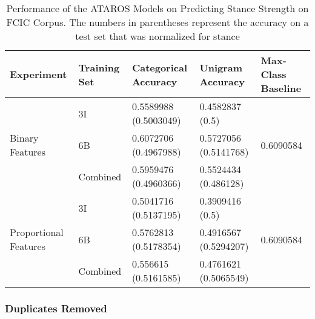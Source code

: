 \begin{table}[h]
\centering
\begin{tabular}{l | l | l | l | l  } 
	\textbf{Experiment}  & \textbf{Training Set} & \textbf{Categorical Accuracy} &  \textbf{Unigram Accuracy} & \textbf{Max-Class Baseline} \\ 
	\hline 
	\multirow{3}{*}{Binary Features}
		& 3I & \num{0.5589988} (\num{0.5003049}) & \num{0.4582837} (\num{0.5}) & \multirow{3}{*}{\num{0.6090584}} \\ 
	    & 6B & \num{0.6072706} (\num{0.4967988}) & \num{0.5727056} (\num{0.5141768}) & \\ 
	    & Combined & \num{0.5959476} (\num{0.4960366}) & \num{0.5524434} (\num{0.486128 	}) & \\  
	\hline
	\multirow{3}{*}{Proportional Features}
		& 3I & \num{0.5041716} (\num{0.5137195}) & \num{0.3909416} (\num{0.5}) & \multirow{3}{*}{\num{0.6090584}} \\ 
	    & 6B & \num{0.5762813} (\num{0.5178354}) & \num{0.4916567} (\num{0.5294207}) & \\ 
	    & Combined & \num{0.556615} (\num{0.5161585}) & \num{0.4761621} (\num{0.5065549}) & \\  
\end{tabular}	
\caption{Performance of the ATAROS Models on Predicting Stance Strength on FCIC Corpus.  The numbers in parentheses represent the accuracy on a test set that was normalized for stance} 
\label{tab:fcic_acc_WVS} 
\end{table}



\subsubsection*{Duplicates Removed}


